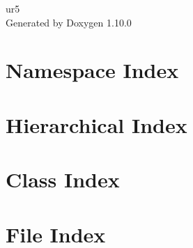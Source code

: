 \documentclass[twoside]{book}
\newcommand{\+}{\discretionary{\mbox{\scriptsize$\hookleftarrow$}}{}{}}
\newcommand{\clearemptydoublepage}{%
    \newpage{\pagestyle{empty}\cleardoublepage}%
  }
\begin{document}
  \raggedbottom
    \hypersetup{pageanchor=false,
                bookmarksnumbered=true,
                pdfencoding=unicode
               }
  \begin{titlepage}
  \vspace*{7cm}
  \begin{center}%
  {\Large ur5}\\
  \vspace*{1cm}
  {\large Generated by Doxygen 1.10.0}\\
  \end{center}
  \end{titlepage}
  \clearemptydoublepage
  \tableofcontents
  \clearemptydoublepage
  \hypersetup{pageanchor=true}







\chapter{Namespace Index}

\chapter{Hierarchical Index}

\chapter{Class Index}

\chapter{File Index}

\end{document}
